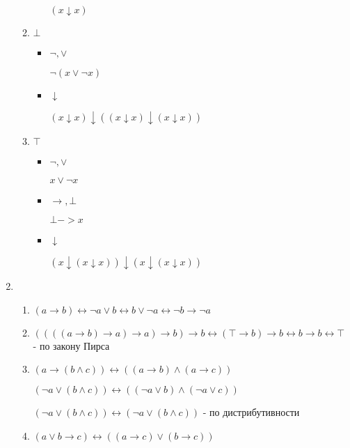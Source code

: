 \documentclass{article}
\begin{document}
\begin{enumerate}
\begin{enumerate}
\begin{itemize}
        $(x \downarrow x)$
      \end{itemize}

    \item $\bot$
      \begin{itemize}
      \item $\neg , \lor $

        $\neg (x \lor \neg x)$
      \item $\downarrow$

        $(x \downarrow x) \downarrow ((x \downarrow x) \downarrow (x \downarrow x))$
      \end{itemize}

    \item $\top$
      \begin{itemize}
      \item $\neg , \lor $

        $x \lor \neg x$
      \item $\to , \bot $

        $\bot -> x$
      \item $\downarrow$

        $(x \downarrow (x \downarrow x)) \downarrow (x \downarrow (x \downarrow x))$
      \end{itemize}

  \end{enumerate}

\item
  \begin{enumerate}
    \item $(a \to b) \leftrightarrow \neg a \lor b \leftrightarrow b
      \lor \neg a \leftrightarrow \neg b \to \neg a $

    \item $((((a \to b) \to a) \to a) \to b) \to b \leftrightarrow
      (\top \to b) \to b \leftrightarrow b \to b \leftrightarrow \top$
      - по закону Пирса

    \item

      $(a \to (b \land c)) \leftrightarrow ((a \to b)\land(a \to c))$

      $(\neg a \lor (b \land c)) \leftrightarrow ((\neg a \lor
      b)\land(\neg a \lor c))$

      $(\neg a \lor (b \land c)) \leftrightarrow (\neg a \lor (b \land
      c))$ - по дистрибутивности

    \item $(a \lor b \to c) \leftrightarrow ((a \to c) \lor (b \to
      c))$


\end{enumerate}
\end{enumerate}
\end{document}
